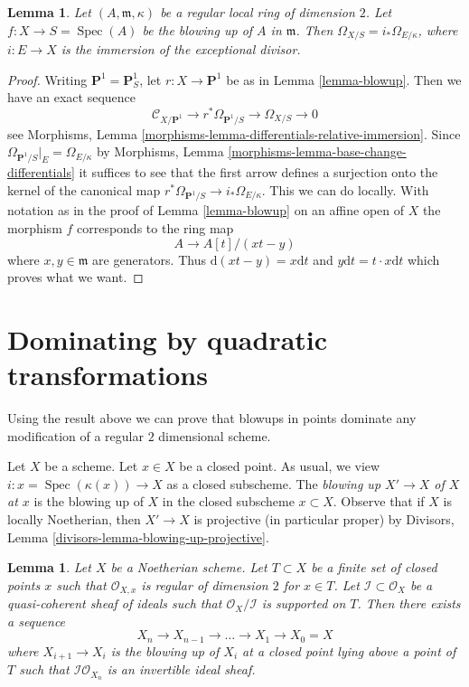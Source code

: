 \documentclass{stacks-project}
\theoremstyle{plain}
\newtheorem{lemma}[subsection]{Lemma}
\theoremstyle{definition}
\theoremstyle{remark}
\numberwithin{equation}{subsection}
\def\Spec{\mathop{\mathrm{Spec}}}
\begin{document}
\begin{lemma}
\label{lemma-differentials-of-blowup}
Let $(A, \mathfrak m, \kappa)$ be a regular local ring of dimension $2$.
Let $f : X \to S = \Spec(A)$ be the blowing up of $A$ in $\mathfrak m$.
Then $\Omega_{X/S} = i_*\Omega_{E/\kappa}$, where $i : E \to X$
is the immersion of the exceptional divisor.
\end{lemma}

\begin{proof}
Writing $\mathbf{P}^1 = \mathbf{P}^1_S$, let
$r : X \to \mathbf{P}^1$ be as in Lemma \ref{lemma-blowup}.
Then we have an exact sequence
$$
\mathcal{C}_{X/\mathbf{P}^1} \to r^*\Omega_{\mathbf{P}^1/S} \to
\Omega_{X/S} \to 0
$$
see Morphisms, Lemma \ref{morphisms-lemma-differentials-relative-immersion}.
Since $\Omega_{\mathbf{P}^1/S}|_E = \Omega_{E/\kappa}$ by
Morphisms, Lemma \ref{morphisms-lemma-base-change-differentials}
it suffices to see that the first arrow defines a surjection
onto the kernel of the canonical map
$r^*\Omega_{\mathbf{P}^1/S} \to i_*\Omega_{E/\kappa}$.
This we can do locally. With notation as in the proof of
Lemma \ref{lemma-blowup} on an affine open of $X$ the morphism $f$
corresponds to the ring map
$$
A \to A[t]/(xt - y)
$$
where $x, y \in \mathfrak m$ are generators. Thus
$\text{d}(xt - y) = x\text{d}t$ and $y\text{d}t = t \cdot x \text{d}t$
which proves what we want.
\end{proof}



\section{Dominating by quadratic transformations}
\label{section-dominating-by-quadratic}

\noindent
Using the result above we can prove that blowups in points dominate
any modification of a regular $2$ dimensional scheme.

\medskip\noindent
Let $X$ be a scheme. Let $x \in X$ be a closed point. As usual, we view
$i : x = \Spec(\kappa(x)) \to X$ as a closed subscheme.
The {\it blowing up $X' \to X$ of $X$ at $x$} is the blowing up of $X$
in the closed subscheme $x \subset X$. Observe that if $X$ is locally
Noetherian, then $X' \to X$ is projective (in particular proper) by
Divisors, Lemma \ref{divisors-lemma-blowing-up-projective}.

\begin{lemma}
\label{lemma-make-ideal-principal}
Let $X$ be a Noetherian scheme. Let $T \subset X$ be a finite set of
closed points $x$ such that $\mathcal{O}_{X, x}$ is
regular of dimension $2$ for $x \in T$.
Let $\mathcal{I} \subset \mathcal{O}_X$ be a quasi-coherent
sheaf of ideals such that $\mathcal{O}_X/\mathcal{I}$ is supported
on $T$.
Then there exists a sequence
$$
X_n \to X_{n - 1} \to \ldots \to X_1 \to X_0 = X
$$
where $X_{i + 1} \to X_i$ is the blowing up of $X_i$ at a closed
point lying above a point of $T$ such that
$\mathcal{I}\mathcal{O}_{X_n}$ is an invertible ideal sheaf.
\end{lemma}
\end{document}
